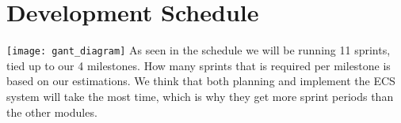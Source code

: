\section*{Development Schedule}
\texttt{[image: gant\_diagram]}
As seen in the schedule we will be running 11 sprints, tied up to our 4 milestones.
How many sprints that is required per milestone is based on our estimations. 
We think that both planning and implement the ECS system will take the most time,
which is why they get more sprint periods than the other modules.
